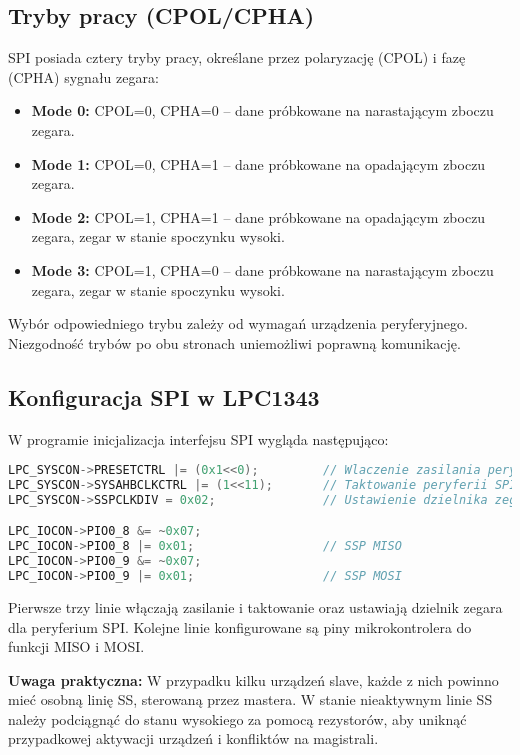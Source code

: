 \documentclass[a4paper,12pt]{report}
\begin{document}
\subsection*{Tryby pracy (CPOL/CPHA)}

SPI posiada cztery tryby pracy, określane przez polaryzację (CPOL) i fazę (CPHA) sygnału zegara:
\begin{itemize}
    \item \textbf{Mode 0:} CPOL=0, CPHA=0 – dane próbkowane na narastającym zboczu zegara.
    \item \textbf{Mode 1:} CPOL=0, CPHA=1 – dane próbkowane na opadającym zboczu zegara.
    \item \textbf{Mode 2:} CPOL=1, CPHA=1 – dane próbkowane na opadającym zboczu zegara, zegar w stanie spoczynku wysoki.
    \item \textbf{Mode 3:} CPOL=1, CPHA=0 – dane próbkowane na narastającym zboczu zegara, zegar w stanie spoczynku wysoki.
\end{itemize}

Wybór odpowiedniego trybu zależy od wymagań urządzenia peryferyjnego. Niezgodność trybów po obu stronach uniemożliwi poprawną komunikację.

\subsection*{Konfiguracja SPI w LPC1343}

W programie inicjalizacja interfejsu SPI wygląda następująco:
\begin{lstlisting}[language=C]
LPC_SYSCON->PRESETCTRL |= (0x1<<0);         // Wlaczenie zasilania peryferii SPI
LPC_SYSCON->SYSAHBCLKCTRL |= (1<<11);       // Taktowanie peryferii SPI
LPC_SYSCON->SSPCLKDIV = 0x02;               // Ustawienie dzielnika zegara SPI

LPC_IOCON->PIO0_8 &= ~0x07;
LPC_IOCON->PIO0_8 |= 0x01;                  // SSP MISO
LPC_IOCON->PIO0_9 &= ~0x07;
LPC_IOCON->PIO0_9 |= 0x01;                  // SSP MOSI
\end{lstlisting}
Pierwsze trzy linie włączają zasilanie i taktowanie oraz ustawiają dzielnik zegara dla peryferium SPI. Kolejne linie konfigurowane są piny mikrokontrolera do funkcji MISO i MOSI.

\textbf{Uwaga praktyczna:} W przypadku kilku urządzeń slave, każde z nich powinno mieć osobną linię SS, sterowaną przez mastera. W stanie nieaktywnym linie SS należy podciągnąć do stanu wysokiego za pomocą rezystorów, aby uniknąć przypadkowej aktywacji urządzeń i konfliktów na magistrali.
\end{document}
